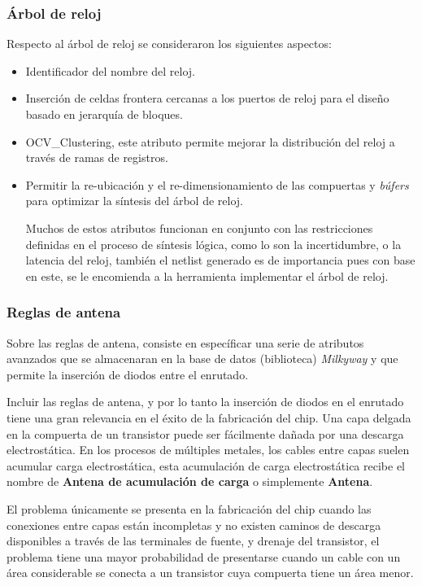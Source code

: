 \subsubsection*{Árbol de reloj}

Respecto al árbol de reloj se consideraron los siguientes aspectos:

\begin{itemize}
\item Identificador del nombre del reloj.
\item Inserción de celdas frontera cercanas a los puertos de reloj para el diseño basado en jerarquía de bloques.
\item OCV\_Clustering, este atributo permite mejorar la distribución del reloj a través de ramas de registros.
\item Permitir la re-ubicación y el re-dimensionamiento de las compuertas y \textit{búfers} para optimizar la síntesis del árbol de reloj.

Muchos de estos atributos funcionan en conjunto con las restricciones definidas en el proceso de síntesis lógica, como lo son la incertidumbre, o la latencia del reloj, también el netlist generado es de importancia pues con base en este, se le encomienda a la herramienta implementar el árbol de reloj.
\end{itemize}

\subsubsection*{Reglas de antena}

Sobre las reglas de antena, consiste en específicar una serie de atributos avanzados que se almacenaran en la base de datos (biblioteca) \textit{Milkyway} y que permite la inserción de diodos entre el enrutado.

Incluir las reglas de antena, y por lo tanto la inserción de diodos en el enrutado tiene una gran relevancia en el éxito de la fabricación del chip. Una capa delgada en la compuerta de un transistor puede ser fácilmente dañada por una descarga electrostática. En los procesos de múltiples metales, los cables entre capas suelen acumular carga electrostática, esta acumulación de carga electrostática recibe el nombre de \textbf{Antena de acumulación de carga} o simplemente \textbf{Antena}.

El problema únicamente se presenta en la fabricación del chip cuando las conexiones entre capas están incompletas y no existen caminos de descarga disponibles a través de las terminales de fuente, y drenaje del transistor, el problema tiene una mayor probabilidad de presentarse cuando un cable con un área considerable se conecta a un transistor cuya compuerta tiene un área menor.

